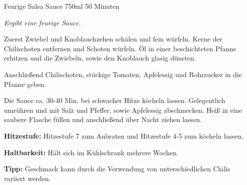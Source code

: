 \documentclass[
  DIV=11,%
  pagesize,%
  fontsize=11pt,%
  paper=a4,%
]{scrartcl}
\begin{document}
\begin{recipe}{Feurige Salsa Sauce} {750ml} {50 Minuten}

\freeform
\textit{Ergibt eine feurige Sauce.}


Zuerst Zwiebel und Knoblauchzehen schälen und fein würfeln.
Kerne der Chilischoten entfernen und Schoten würfeln.
Öl in einer beschichteten Pfanne erhitzen und die Zwiebeln, sowie den Knoblauch glasig dünsten.


Anschließend Chilischoten, stückige Tomaten, Apfelessig und Rohrzucker in die Pfanne geben.


Die Sauce ca. 30-40 Min. bei schwacher Hitze köcheln lassen.
Gelegentlich umrühren und mit Salz und Pfeffer, sowie Apfelessig abschmecken.
Heiß in eine saubere Flasche füllen und anschließend über Nacht ziehen lassen.

\freeform
\hrulefill

\freeform
\textbf{Hitzestufe:}
Hitzestufe 7 zum Anbraten und Hitzestufe 4-5 zum köcheln lassen.

\freeform 
\textbf{Haltbarkeit:}
Hält sich im Kühlschrank mehrere Wochen.

\freeform 
\textbf{Tipp:}
Geschmack kann durch die Verwendung von unterschiedlichen Chilis variiert werden.

\end{recipe}
\end{document}
